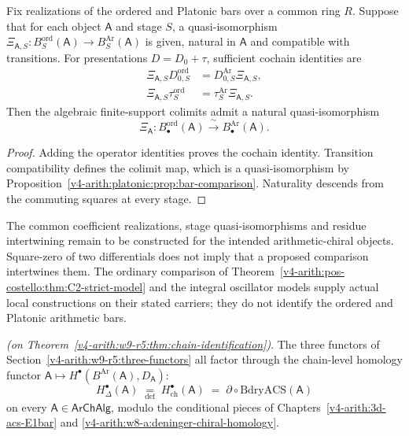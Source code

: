 \begin{theorem}
\label{v4-arith:w9-r5:thm:chain-identification}
Fix realizations of the ordered and Platonic bars over a common ring
\(R\). Suppose that for each object \(\mathsf A\) and stage \(S\),
a quasi-isomorphism
\(\Xi_{\mathsf A,S}:B^{\mathrm{ord}}_S(\mathsf A)\to
B^{\mathrm{Ar}}_S(\mathsf A)\) is given, natural in \(\mathsf A\)
and compatible with transitions. For presentations \(D=D_0+\tau\),
sufficient cochain identities are
\[
\begin{aligned}
\Xi_{\mathsf A,S}D^{\mathrm{ord}}_{0,S}
 &=D^{\mathrm{Ar}}_{0,S}\Xi_{\mathsf A,S},\\
\Xi_{\mathsf A,S}\tau^{\mathrm{ord}}_S
 &=\tau^{\mathrm{Ar}}_S\Xi_{\mathsf A,S}.
\end{aligned}
\]
Then the algebraic finite-support colimits admit a natural quasi-isomorphism
\begin{equation}
\label{v4-arith:w9-r5:eq:chain-identification}
\Xi_{\mathsf A}:B^{\mathrm{ord}}_\bullet(\mathsf A)
\xrightarrow{\;\sim\;}B^{\mathrm{Ar}}_\bullet(\mathsf A).
\end{equation}
\end{theorem}
\begin{proof}
Adding the operator identities proves the cochain identity.
Transition compatibility defines the colimit map, which is a
quasi-isomorphism by Proposition~\ref{v4-arith:platonic:prop:bar-comparison}.
Naturality descends from the commuting squares at every stage.
\end{proof}

The common coefficient realizations, stage quasi-isomorphisms and
residue intertwining remain to be constructed for the intended
arithmetic-chiral objects. Square-zero of two differentials does not
imply that a proposed comparison intertwines them. The ordinary
comparison of Theorem~\ref{v4-arith:pos-costello:thm:C2-strict-model}
and the integral oscillator models supply actual local constructions
on their stated carriers; they do not identify the ordered and
Platonic arithmetic bars.

\begin{corollary}
\label{v4-arith:w9-r5:cor:factoring}
\ClaimStatusProvedHereConditional \emph{(on
Theorem~\ref{v4-arith:w9-r5:thm:chain-identification})}. The three
functors of
Section~\ref{v4-arith:w9-r5:three-functors} all factor through the
chain-level homology functor
\(\mathsf{A}\mapsto H^{\bullet}(B^{\mathrm{Ar}}(\mathsf{A}),D_{\mathsf{A}})\):
\[
H^{\bullet}_{\Delta}(\mathsf{A})
\;\underset{\mathrm{def}}{=}\;H^{\bullet}_{\mathrm{ch}}(\mathsf{A})
\;=\;\partial\circ\mathrm{BdryACS}(\mathsf{A})
\]
on every \(\mathsf{A}\in\mathsf{ArChAlg}\), modulo the conditional
pieces of Chapters~\ref{v4-arith:3d-acs-E1bar} and
\ref{v4-arith:w8-a:deninger-chiral-homology}.
\end{corollary}

